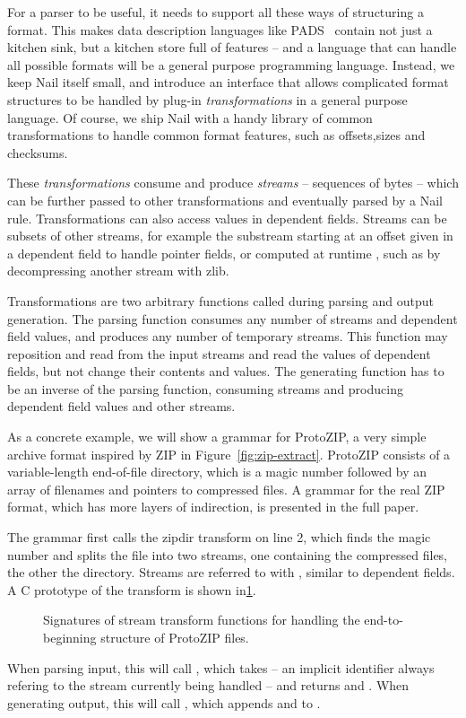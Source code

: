 For a parser to be useful, it needs to support all these ways of structuring a format. This makes data description languages like
PADS~\cite{Fisher:2005:PDL:1064978.1065046} contain not just a kitchen sink, but a kitchen store
full of features -- and a language that can handle all possible formats will be a general
purpose programming language.  Instead, we keep Nail itself small, and introduce an
interface that allows complicated format structures to be handled by  plug-in \emph{transformations} 
in a general purpose
language. Of course, we ship Nail with a handy library of common transformations to handle common
format features, such as offsets,sizes and checksums.

These \emph{transformations} consume and produce
\emph{streams} -- sequences of bytes -- which can be further passed to other transformations and
eventually parsed by a Nail rule. Transformations can also access values in dependent fields. 
Streams can be subsets of other streams, for example the substream starting at an
offset given in a dependent field to handle pointer fields, or computed at runtime
, such as by decompressing another stream with zlib.


Transformations are two arbitrary functions called during parsing and output generation.
The parsing function consumes any number of streams and dependent field values,
and produces any number of temporary streams. This function may reposition and read from the
input streams and read the values of dependent fields, but not change their contents and values. 
The generating function has to be an inverse of the parsing function, consuming streams and
producing dependent field values and other streams.



As a concrete example, we will show a grammar for ProtoZIP, a very simple archive format inspired by ZIP in
Figure~\ref{fig:zip-extract}. ProtoZIP consists of a variable-length end-of-file directory, which
is a magic number followed by an array of filenames and pointers to compressed files. A grammar for the real ZIP format, which
has more layers of indirection, is presented in the full paper. 

 The grammar first calls the zipdir transform on line 2, which finds the magic number and splits the file into
 two streams, one containing the compressed files, the other the directory.  Streams are referred to
 with , similar to dependent fields. A C prototype of the  transform is
 shown in\ref{fig:zip-transform}. 
\begin{figure}[tb]
\smaller[0.5]

\caption{Signatures of stream transform functions for handling the
end-to-beginning structure of ProtoZIP files.}
\label{fig:zip-transform}
\end{figure}
When parsing input, this will call , which takes  -- an implicit
identifier always refering to the stream currently being handled -- and returns  and
. When generating output, this will call , which appends
 and  to .


